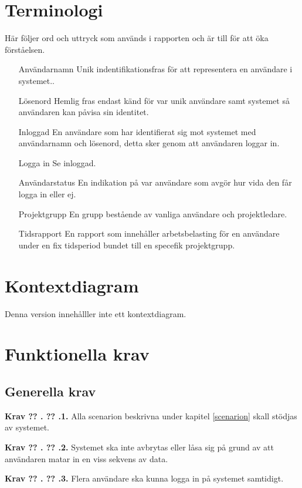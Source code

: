 \documentclass[a4paper]{article}
\newcommand\getcurrentref[1]{%
 \ifnumequal{\value{#1}}{0}
  {??}
  {\the\value{#1}}%
}
\newcommand\requirement[2]{
	\numberedrow{Krav}{#1}{#2}
}
\newcommand\numberedrow[3]{
	\noindent
	\textbf{#1 \getcurrentref{section}.\getcurrentref{subsection}.#2.} #3
	
}
\begin{document}
\section{Terminologi}
Här följer ord och uttryck som används i rapporten och är till för att öka förståelsen.
\begin{itemize}
\item [Användarnamn] Unik indentifikationsfras för att representera en användare i systemet..
\item [Lösenord] Hemlig fras endast känd för var unik användare samt systemet så användaren kan påvisa sin identitet.
\item [Inloggad] En användare som har identifierat sig mot systemet med användarnamn och lösenord, detta sker genom att användaren loggar in.
\item [Logga in] Se inloggad.
\item [Användarstatus] En indikation på var användare som avgör hur vida den får logga in eller ej.
\item [Projektgrupp] En grupp bestående av vanliga användare och projektledare.
\item [Tidsrapport] En rapport som innehåller arbetsbelasting för en användare under en fix tidsperiod bundet till en specefik projektgrupp.
\end{itemize}
\section{Kontextdiagram}
Denna version innehålller inte ett kontextdiagram.
\section{Funktionella krav}
\subsection{Generella krav}
 \requirement{1}{Alla scenarion beskrivna under kapitel \ref{scenarion} skall stödjas av systemet.}
 \requirement{2}{Systemet ska inte avbrytas eller låsa sig på grund av att användaren matar in en viss sekvens av data.}
 \requirement{3}{Flera användare ska kunna logga in på systemet samtidigt.}
 
\end{document}
